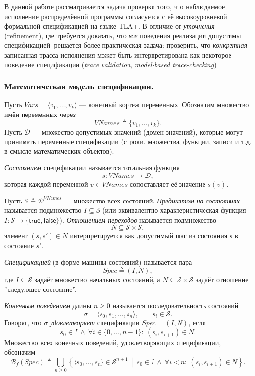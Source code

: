 
В данной работе рассматривается задача проверки того, что наблюдаемое
исполнение распределённой программы согласуется с её высокоуровневой формальной
спецификацией на языке TLA+. В отличие от \emph{уточнения} (refinement), где
требуется доказать, что \emph{все} поведения реализации допустимы
спецификацией, решается более практическая задача: проверить, что
\emph{конкретная} записанная трасса исполнения может быть интерпретирована как
некоторое поведение спецификации (\emph{trace validation}, \emph{model-based
trace-checking})

\subsubsection{Математическая модель спецификации.}

\begin{definition}\label{spec}
Пусть $Vars=\langle v_1,\dots,v_k\rangle$ --- конечный кортеж переменных.
Обозначим множество имён переменных через
\[
\mathit{VNames} \triangleq \{v_1,\dots,v_k\}.
\]
Пусть $\mathcal{D}$ --- множество допустимых значений (домен значений), которые
могут принимать переменные спецификации (строки, множества, функции, записи и
т.д. в смысле математических объектов).

\emph{Состоянием} спецификации называется тотальная функция
\[
s:\mathit{VNames}\to \mathcal{D},
\]
которая каждой переменной $v\in\mathit{VNames}$ сопоставляет её значение $s(v)$.

Пусть $\mathcal{S}\triangleq \mathcal{D}^{\mathit{VNames}}$ --- множество всех состояний.
\emph{Предикатом на состояниях} называется подмножество $I\subseteq\mathcal{S}$
(или эквивалентно характеристическая функция $I:\mathcal{S}\to\{\mathsf{true},\mathsf{false}\}$).
\emph{Отношением переходов} называется подмножество
\[
N \subseteq \mathcal{S}\times \mathcal{S},
\]
элемент $(s,s')\in N$ интерпретируется как допустимый шаг из состояния $s$ в
состояние $s'$.

\emph{Спецификацией} (в форме машины состояний) называется пара
\[
\mathit{Spec}\triangleq (I,N),
\]
где $I\subseteq\mathcal{S}$ задаёт множество начальных состояний, а
$N\subseteq\mathcal{S}\times\mathcal{S}$ задаёт отношение ``следующее состояние''.

\emph{Конечным поведением} длины $n\ge 0$ называется последовательность состояний
\[
\sigma=\langle s_0,s_1,\dots,s_n\rangle,\qquad s_i\in\mathcal{S}.
\]
Говорят, что $\sigma$ \emph{удовлетворяет} спецификации $\mathit{Spec}=(I,N)$,
если
\[
s_0\in I\ \wedge\ \forall i\in\{0,\dots,n-1\}:\ (s_i,s_{i+1})\in N.
\]
Множество всех конечных поведений, удовлетворяющих спецификации, обозначим
\[
\mathcal{B}_f(\mathit{Spec}) \triangleq
\bigcup_{n\ge 0}\left\{
\langle s_0,\dots,s_n\rangle \in \mathcal{S}^{n+1}\ \middle|\
s_0\in I \ \wedge\ \forall i<n:\ (s_i,s_{i+1})\in N
\right\}.
\]
\end{definition}

